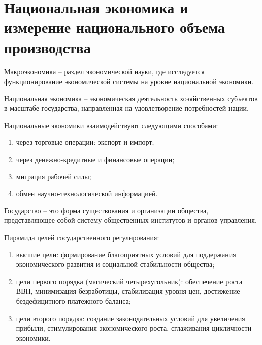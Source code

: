 \section{Национальная экономика и измерение национального объема производства}

Макроэкономика -- раздел экономической науки, где исследуется функционирование
экономической системы на уровне национальной экономики.

Национальная экономика -- экономическая деятельность хозяйственных субъектов в
масштабе государства, направленная на удовлетворение потребностей нации.

Национальные экономики взаимодействуют следующими способами:
\begin{enumerate}
    \item через торговые операции: экспорт и импорт;
    \item через денежно-кредитные и финансовые операции;
    \item миграция рабочей силы;
    \item обмен научно-технологической информацией.
\end{enumerate}

Государство -- это форма существования и организации общества, представляющее
собой систему общественных институтов и органов управления.

Пирамида целей государственного регулирования:
\begin{enumerate}
    \item высшие цели: формирование благоприятных условий для поддержания
    экономического развития и социальной стабильности общества;
    \item цели первого порядка (магический четырехугольник): обеспечение роста
    ВВП, минимизация безработицы, стабилизация уровня цен, достижение
    бездефицитного платежного баланса;
    \item цели второго порядка: создание законодательных условий для увеличения
    прибыли, стимулирования экономического роста, сглаживания цикличности
    экономики.
\end{enumerate}

